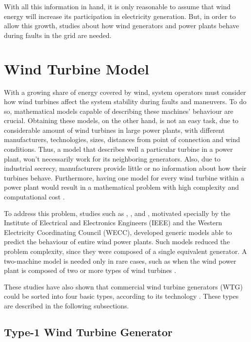 With all this information in hand, it is only reasonable to assume that wind energy will increase its participation in electricity generation. But, in order to allow this growth, studies about how wind generators and power plants behave during faults in the grid are needed.

\section{Wind Turbine Model}

With a growing share of energy covered by wind, system operators must consider how wind turbines affect the system stability during faults and maneuvers. To do so, mathematical models capable of describing these machines' behaviour are crucial. Obtaining these models, on the other hand, is not an easy task, due to considerable amount of wind turbines in large power plants, with different manufacturers, technologies, sizes, distances from point of connection and wind conditions. Thus, a model that describes well a particular turbine in a power plant, won't necessarily work for its neighboring generators. Also, due to industrial secrecy, manufacturers provide little or no information about how their turbines behave. Furthermore, having one model for every wind turbine within a power plant would result in a mathematical problem with high complexity and computational cost \cite{Erlich2012}.

To address this problem, studies such as \cite{Muljadi2008}, \cite{Ellis2011}, \cite{council2008wecc} and \cite{Asmine2011}, motivated specially by the Institute of Electrical and Electronics Engineers (IEEE) and the Western Electricity Coordinating Council (WECC), developed generic models able to predict the behaviour of entire wind power plants. Such models reduced the problem complexity, since they were composed of a single equivalent generator. A two-machine model is needed only in rare cases, such as when the wind power plant is composed of two or more types of wind turbines \cite{Ellis2011}.

These studies have also shown that commercial wind turbine generators (WTG) could be sorted into four basic types, according to its technology \cite{Ellis2011}. These types are described in the following subsections.

\subsection{Type-1 Wind Turbine Generator}

